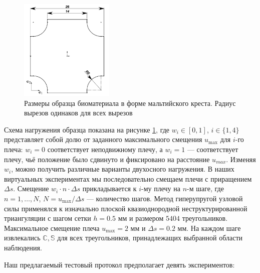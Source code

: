 

\begin{figure}[H]
  \centering
  \includegraphics[width=0.4\textwidth]{img/malt_geom.png}
  \caption{Размеры образца биоматериала в форме мальтийского креста. 
  Радиус вырезов одинаков для всех вырезов}
  \label{fig:malt_geometry}
  \label{fig:malt_displacements}
\end{figure}

Схема нагружения образца показана на рисунке \ref{fig:malt_displacements}, где $w_i \in [0,1]$, $i \in \{1,4\}$
представляет собой долю от заданного максимального смещения $u_{\max}$ для $i$-го плеча: $w_i = 0$ 
соответствует неподвижному плечу, а $w_i = 1$ — соответствует плечу, чьё положение было сдвинуто и фиксировано на расстояние $u_{max}$. 
Изменяя $w_i$, можно получить различные варианты двухосного нагружения. 
В наших виртуальных экспериментах мы последовательно
смещаем плечи с приращением $\Delta s$. 
Смещение $w_i \cdot n \cdot \Delta s$ прикладывается к $i$-му плечу на $n$-м шаге, где $n = 1, \ldots, N$, 
$N = u_{\max}/\Delta s$ — количество шагов. 
Метод гиперупругой узловой силы применялся к изначально плоской квазиоднородной неструктурированной триангуляции с шагом сетки $h=0.5$ мм и размером $5 404$ треугольников. Максимальное смещение плеча
$u_{\max} = 2$ мм и $\Delta s = 0.2$ мм.
На каждом шаге извлекались $\mathbb{C}, \mathbb{S}$ для всех треугольников, принадлежащих выбранной области наблюдения. 

 
 
Наш предлагаемый тестовый протокол предполагает девять экспериментов:

